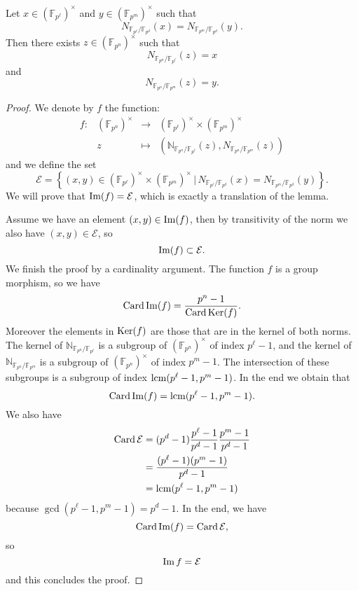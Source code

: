 \documentclass[a4paper,11pt]{article}
\begin{document}
\begin{lm}
  \label{lm:norms}
  Let $x\in (\mathbb{F}_{p^\ell})^\times$ and $y\in(\mathbb{F}_{p^m})^\times$ such that 
  \[
    N_{\mathbb{F}_{p^\ell}/\mathbb{F}_{p^d}}(x)=N_{\mathbb{F}_{p^m}/\mathbb{F}_{p^d}}(y).
  \]
  Then there exists $z\in(\mathbb{F}_{p^n})^\times$ such that
  \[
    N_{\mathbb{F}_{p^n}/\mathbb{F}_{p^\ell}}(z)=x
  \]
  and
  \[
    N_{\mathbb{F}_{p^n}/\mathbb{F}_{p^m}}(z)=y.
  \]
\end{lm}
\begin{proof}
  We denote by $f$ the function:
\[
\begin{array}{cccc}
  f: & (\mathbb{F}_{p^n})^\times & \to &
  (\mathbb{F}_{p^\ell})^\times\times(\mathbb{F}_{p^m})^\times\\
  & z & \mapsto & (\mathbb{N}_{\mathbb{F}_{p^n}/\mathbb{F}_{p^\ell}}(z),
  N_{\mathbb{F}_{p^n}/\mathbb{F}_{p^m}}(z))
\end{array}
\]
and we define the set
\[
  \mathcal E = \left\{ (x, y)\in
    (\mathbb{F}_{p^\ell})^\times\times(\mathbb{F}_{p^m})^\times\,|\,N_{\mathbb{F}_{p^\ell}/\mathbb{F}_{p^d}}(x)=N_{\mathbb{F}_{p^m}/\mathbb{F}_{p^d}}(y)\right\}.
\]
We will prove that $\operatorname{Im}(f)=\mathcal E$, which is exactly a translation of the
lemma.

Assume we have an element $(x,y)\in\operatorname{Im}(f)$, then by transitivity of the norm we
also have $(x,y)\in\mathcal E$, so 
\[
  \operatorname{Im}(f)\subset\mathcal E.
\]
We finish the proof by a cardinality argument. The function $f$ is a group
morphism, so we have 
\[
  \operatorname{Card}\operatorname{Im}(f)=\frac{p^{n}-1}{\operatorname{Card}\operatorname{Ker}(f)}.
\]
Moreover the elements in $\operatorname{Ker}(f)$ are those that are in the kernel of both
norms. The kernel of $\mathbb{N}_{\mathbb{F}_{p^n}/\mathbb{F}_{p^\ell}}$ is a
subgroup of $(\mathbb{F}_{p^n})^\times$ of index $p^{\ell}-1$, and the kernel of
$\mathbb{N}_{\mathbb{F}_{p^n}/\mathbb{F}_{p^m}}$ is a
subgroup of $(\mathbb{F}_{p^n})^\times$ of index $p^{m}-1$. The intersection of
these subgroups is a subgroup of index $\operatorname{lcm}(p^{\ell}-1, p^m-1)$. In the end we
obtain that
\[
  \operatorname{Card}\operatorname{Im}(f) = \operatorname{lcm}(p^\ell-1, p^m-1).
\]
We also have 
\begin{align*}
  \operatorname{Card}\mathcal E &= (p^{d}-1)\frac{p^\ell-1}{p^d-1}\frac{p^m-1}{p^d-1}\\
  &= \frac{(p^\ell-1)(p^m-1)}{p^d-1}\\
  &= \operatorname{lcm}(p^\ell-1, p^m-1)
\end{align*}
because $\gcd(p^\ell-1, p^m-1)=p^d-1$. In the end, we have 
\[
  \operatorname{Card}\operatorname{Im}(f)=\operatorname{Card}\mathcal E,
\]
so
\[
  \operatorname{Im} f = \mathcal E
\]
and this concludes the proof.
\end{proof}
\end{document}
